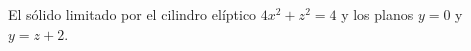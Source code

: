 \item El sólido limitado por el cilindro elíptico $4x^2 + z^2 = 4$ y los planos $y = 0$ y $y = z + 2$.
